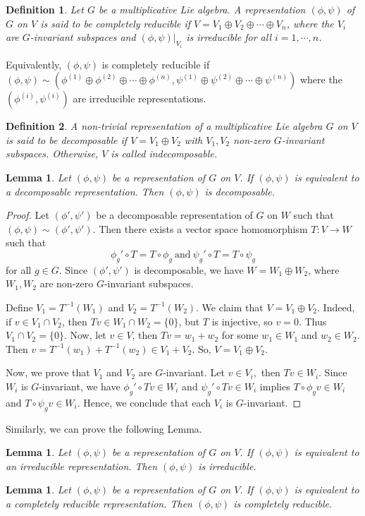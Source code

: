 \documentclass[10 pt,oneside,reqno,a4paper]{amsart}
\newtheorem{definition}{Definition}[section]
\newtheorem{lemma}[theorem]{Lemma}
\numberwithin{equation}{section}
\begin{document}
\begin{definition}
    Let $G$ be a multiplicative Lie algebra. A representation $(\phi, \psi)$ of $G$ on $V$ is said to be completely reducible if $V = V_1 \oplus V_2 \oplus \cdots \oplus V_n$, where the $V_i$ are $G$-invariant subspaces and $(\phi,\psi)|_{V_i}$ is irreducible for all $i=1,\cdots ,n$.
\end{definition}
 Equivalently, $(\phi,\psi)$ is completely reducible if $(\phi,\psi) \sim (\phi^{(1)}\oplus \phi^{(2)}\oplus \cdots \oplus \phi^{(n)},\psi^{(1)}\oplus \psi^{(2)}\oplus \cdots \oplus \psi^{(n)})$ where the $(\phi^{(i)},\psi^{(i)})$ are irreducible representations.

 \begin{definition}
     A non-trivial representation of a multiplicative Lie algebra $G$ on $V$ is said to be \textit{decomposable} if $V=V_1 \oplus V_2$ with $V_1, V_2$  non-zero $G$-invariant subspaces. Otherwise, $V$ is called \textit{indecomposable}.
 \end{definition}
\begin{lemma}
    Let $(\phi,\psi)$ be a representation of $G$ on $V$. If $(\phi,\psi)$ is equivalent to a decomposable representation. Then $(\phi,\psi)$ is decomposable.
\end{lemma}
\begin{proof}
    Let $(\phi',\psi')$ be a decomposable representation of $G$ on $W$ such that $(\phi,\psi)\sim (\phi',\psi')$. Then there exists a vector space homomorphism $T:V \to W$ such that $$\phi_g' \circ T=T \circ \phi_g ~\text{and}~ \psi_g' \circ T=T \circ \psi_g$$ for all $g\in G.$ Since $(\phi',\psi')$ is decomposable, we have $W=W_1 \oplus W_2$, where $W_1,W_2$ are non-zero $G$-invariant subspaces.
    
    Define $V_1=T^{-1}(W_1)$ and $ V_2=T^{-1}(W_2)$. We claim that $V=V_1 \oplus V_2$. Indeed, if $v\in V_1 \cap V_2$, then $Tv\in W_1 \cap W_2=\{0\}$, but $T$ is injective, so $v=0$. Thus $V_1 \cap V_2=\{0\}$. Now, let $v\in V$, then $Tv=w_1 + w_2$ for some $w_1\in W_1$ and $w_2 \in W_2$. Then $v=T^{-1}(w_1)+ T^{-1}(w_2) \in V_1 + V_2$. So, $V=V_1 \oplus V_2.$
    
    Now, we prove that $V_1$ and $V_2$ are $G$-invariant. Let $v\in V_i,$ then $Tv\in W_i$. Since $W_i$ is $G$-invariant, we have $\phi_g' \circ Tv\in W_i$ and $\psi_g' \circ Tv\in W_i$ implies $T\circ \phi_gv \in W_i$ and $T\circ \psi_gv \in W_i$. Hence, we conclude that each $V_i$ is $G$-invariant.
\end{proof} 
Similarly, we can prove the following Lemma.
\begin{lemma}
    Let $(\phi,\psi)$ be a representation of $G$ on $V$. If $(\phi,\psi)$ is equivalent to an irreducible representation. Then $(\phi,\psi)$ is irreducible.
\end{lemma}
\begin{lemma}
    Let $(\phi,\psi)$ be a representation of $G$ on $V$. If $(\phi,\psi)$ is equivalent to a completely reducible representation. Then $(\phi,\psi)$ is completely reducible.
\end{lemma}
\end{document}
